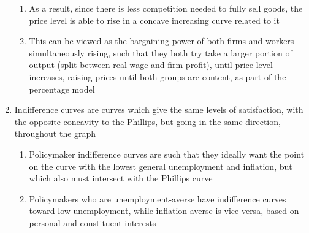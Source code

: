 \documentclass[11 pt, twoside]{article}
\begin{document}
\begin{enumerate}
\begin{enumerate}
\item As a result, since there is less competition needed to fully sell goods, the price level is able to rise in a concave increasing curve related to it
\item This can be viewed as the bargaining power of both firms and workers simultaneously rising, such that they both try take a larger portion of output (split between real wage and firm profit), until price level increases, raising prices until both groups are content, as part of the percentage model
\end{enumerate}
\item Indifference curves are curves which give the same levels of satisfaction, with the opposite concavity to the Phillips, but going in the same direction, throughout the graph
\begin{enumerate}
\item Policymaker indifference curves are such that they ideally want the point on the curve with the lowest general unemployment and inflation, but which also must intersect with the Phillips curve
\item Policymakers who are unemployment-averse have indifference curves toward low unemployment, while inflation-averse is vice versa, based on personal and constituent interests
\end{enumerate}
\end{enumerate}
\end{document}
